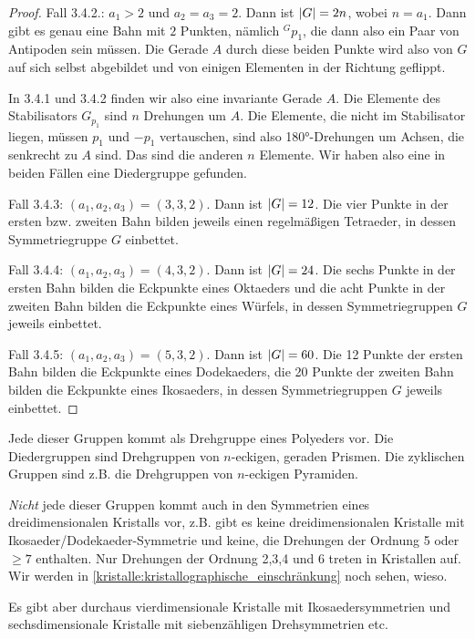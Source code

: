\begin{proof}
Fall 3.4.2.: $a_1>2$ und $a_2=a_3=2$. Dann ist $\lvert G\rvert=2n$, wobei $n=a_1$. Dann gibt es genau eine Bahn mit $2$ Punkten, nämlich ${^Gp_1}$, die dann also ein Paar von Antipoden sein müssen. Die Gerade $A$ durch diese beiden Punkte wird also von $G$ auf sich selbst abgebildet und von einigen Elementen in der Richtung geflippt.

In 3.4.1 und 3.4.2 finden wir also eine invariante Gerade $A$. Die Elemente des Stabilisators $G_{p_1}$ sind $n$ Drehungen um $A$. Die Elemente, die nicht im Stabilisator liegen, müssen $p_1$ und $-p_1$ vertauschen, sind also 180°-Drehungen um Achsen, die senkrecht zu $A$ sind. Das sind die anderen $n$ Elemente. Wir haben also eine in beiden Fällen eine Diedergruppe gefunden.

Fall 3.4.3: $(a_1,a_2,a_3)=(3,3,2)$. Dann ist $\lvert G\rvert=12$. Die vier Punkte in der ersten bzw. zweiten Bahn bilden jeweils einen regelmäßigen Tetraeder, in dessen Symmetriegruppe $G$ einbettet.

Fall 3.4.4: $(a_1,a_2,a_3)=(4,3,2)$. Dann ist $\lvert G\rvert=24$. Die sechs Punkte in der ersten Bahn bilden die Eckpunkte eines Oktaeders und die acht Punkte in der zweiten Bahn bilden die Eckpunkte eines Würfels, in dessen Symmetriegruppen $G$ jeweils einbettet.

Fall 3.4.5: $(a_1,a_2,a_3)=(5,3,2)$. Dann ist $\lvert G\rvert=60$. Die 12 Punkte der ersten Bahn bilden die Eckpunkte eines Dodekaeders, die 20 Punkte der zweiten Bahn bilden die Eckpunkte eines Ikosaeders, in dessen Symmetriegruppen $G$ jeweils einbettet.
\end{proof}

\begin{remark}
Jede dieser Gruppen kommt als Drehgruppe eines Polyeders vor. Die Diedergruppen sind Drehgruppen von $n$-eckigen, geraden Prismen. Die zyklischen Gruppen sind z.B. die Drehgruppen von $n$-eckigen Pyramiden.
\end{remark}

\begin{remark}
\emph{Nicht} jede dieser Gruppen kommt auch in den Symmetrien eines dreidimensionalen Kristalls vor, z.B. gibt es keine dreidimensionalen Kristalle mit Ikosaeder/Dodekaeder-Symmetrie und keine, die Drehungen der Ordnung 5 oder $\geq 7$ enthalten. Nur Drehungen der Ordnung 2,3,4 und 6 treten in Kristallen auf. Wir werden in \ref{kristalle:kristallographische_einschränkung} noch sehen, wieso.

Es gibt aber durchaus vierdimensionale Kristalle mit Ikosaedersymmetrien und sechsdimensionale Kristalle mit siebenzähligen Drehsymmetrien etc.
\end{remark}